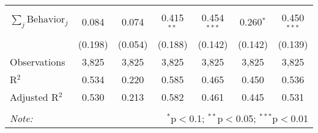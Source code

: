\begin{tabular}{@{\extracolsep{1pt}}lcccccc}
\hline \\[-1.8ex] 
$\sum_j \mathrm{Behavior}_j$ & 0.084 & 0.074 & 0.415$^{**}$ & 0.454$^{***}$ & 0.260$^{*}$ & 0.450$^{***}$ \\ 
 & (0.198) & (0.054) & (0.188) & (0.142) & (0.142) & (0.139) \\ 
Observations & 3,825 & 3,825 & 3,825 & 3,825 & 3,825 & 3,825 \\ 
R$^{2}$ & 0.534 & 0.220 & 0.585 & 0.465 & 0.450 & 0.536 \\ 
Adjusted R$^{2}$ & 0.530 & 0.213 & 0.582 & 0.461 & 0.445 & 0.531 \\ 
\hline 
\hline \\[-1.8ex] 
\textit{Note:}  & \multicolumn{6}{r}{$^{*}$p$<$0.1; $^{**}$p$<$0.05; $^{***}$p$<$0.01} \\ 
\end{tabular} 